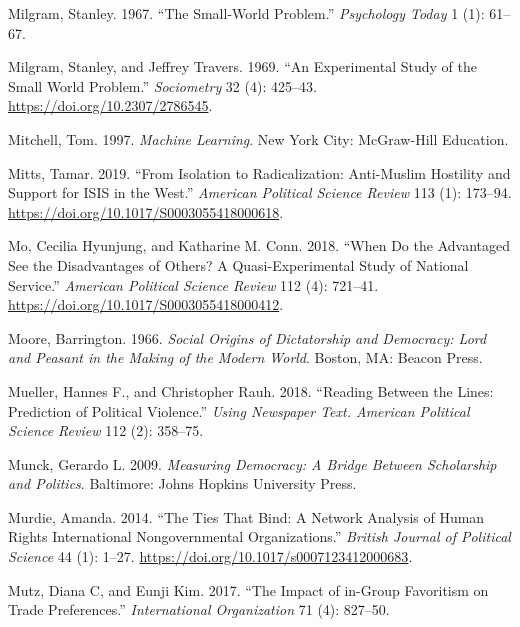 \documentclass{book}
\newlength{\cslhangindent}
\newlength{\cslentryspacingunit} %
\newenvironment{CSLReferences}[2] %
 {%
  \setlength{\parindent}{0pt}
  \ifodd #1
  \let\oldpar\par
  \def\par{\hangindent=\cslhangindent\oldpar}
  \fi
  \setlength{\parskip}{#2\cslentryspacingunit}
 }%
 {}
\begin{document}
\begin{CSLReferences}{1}{0}
\leavevmode{}%
Milgram, Stanley. 1967. {``The Small-World Problem.''} \emph{Psychology Today}
1 (1): 61--67.

\leavevmode{}%
Milgram, Stanley, and Jeffrey Travers. 1969. {``An Experimental Study of the
Small World Problem.''} \emph{Sociometry} 32 (4): 425--43.
\url{https://doi.org/10.2307/2786545}.

\leavevmode{}%
Mitchell, Tom. 1997. \emph{\emph{Machine Learning}}. New York City:
McGraw-Hill Education.

\leavevmode{}%
Mitts, Tamar. 2019. {``From Isolation to Radicalization: Anti-Muslim Hostility
and Support for ISIS in the West.''} \emph{American Political Science Review}
113 (1): 173--94. \url{https://doi.org/10.1017/S0003055418000618}.

\leavevmode{}%
Mo, Cecilia Hyunjung, and Katharine M. Conn. 2018. {``When Do the Advantaged
See the Disadvantages of Others? A Quasi-Experimental Study of National
Service.''} \emph{American Political Science Review} 112 (4): 721--41.
\url{https://doi.org/10.1017/S0003055418000412}.

\leavevmode{}%
Moore, Barrington. 1966. \emph{Social {Origins} of {Dictatorship} and
{Democracy}: {Lord} and {Peasant} in the {Making} of the {Modern World}}.
{Boston, MA}: {Beacon Press}.

\leavevmode{}%
Mueller, Hannes F., and Christopher Rauh. 2018. {``Reading Between the Lines:
Prediction of Political Violence.''} \emph{Using Newspaper Text.
\emph{American Political Science Review}} 112 (2): 358--75.

\leavevmode{}%
Munck, Gerardo L. 2009. \emph{Measuring Democracy: A Bridge Between
Scholarship and Politics}. {Baltimore}: {Johns Hopkins University Press}.

\leavevmode{}%
Murdie, Amanda. 2014. {``The Ties That Bind: A Network Analysis of Human
Rights International Nongovernmental Organizations.''} \emph{British Journal
of Political Science} 44 (1): 1--27.
\url{https://doi.org/10.1017/s0007123412000683}.

\leavevmode{}%
Mutz, Diana C, and Eunji Kim. 2017. {``The Impact of in-Group Favoritism on
Trade Preferences.''} \emph{International Organization} 71 (4): 827--50.


\end{CSLReferences}
\end{document}
